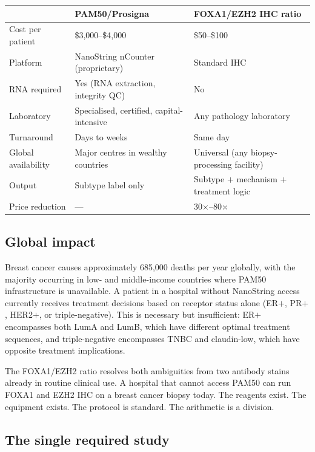 \documentclass[12pt, a4paper]{article}
\begin{document}
\begin{center}
\begin{tabular}{p{4cm}p{4.5cm}p{4.5cm}}
\toprule
& \textbf{PAM50/Prosigna} & \textbf{FOXA1/EZH2 IHC ratio} \\
\midrule
Cost per patient
  & \$3,000--\$4,000
  & \$50--\$100 \\
Platform
  & NanoString nCounter (proprietary)
  & Standard IHC \\
RNA required
  & Yes (RNA extraction, integrity QC)
  & No \\
Laboratory
  & Specialised, certified, capital-intensive
  & Any pathology laboratory \\
Turnaround
  & Days to weeks
  & Same day \\
Global availability
  & Major centres in wealthy countries
  & Universal (any biopsy-processing facility) \\
Output
  & Subtype label only
  & Subtype $+$ mechanism $+$ treatment logic \\
Price reduction
  & ---
  & 30$\times$--80$\times$ \\
\bottomrule
\end{tabular}
\end{center}

\subsection{Global impact}

Breast cancer causes approximately 685,000 deaths per year
globally, with the majority occurring in low- and
middle-income countries where PAM50 infrastructure is
unavailable. A patient in a hospital without NanoString
access currently receives treatment decisions based on
receptor status alone (ER$+$, PR$+$, HER2$+$, or
triple-negative). This is necessary but insufficient:
ER$+$ encompasses both LumA and LumB, which have different
optimal treatment sequences, and triple-negative encompasses
TNBC and claudin-low, which have opposite treatment
implications.

The FOXA1/EZH2 ratio resolves both ambiguities from two
antibody stains already in routine clinical use. A hospital
that cannot access PAM50 can run FOXA1 and EZH2 IHC on a
breast cancer biopsy today. The reagents exist. The
equipment exists. The protocol is standard. The arithmetic
is a division.

\subsection{The single required study}
\end{document}
